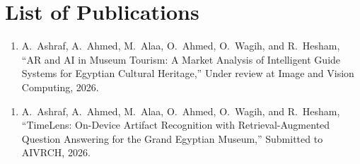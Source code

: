 \chapter*{List of Publications}

\begin{enumerate}[leftmargin=2em]
  \item A.\ Ashraf, A.\ Ahmed, M.\ Alaa, O.\ Ahmed, O.\ Wagih, and R.\ Hesham,
        ``AR and AI in Museum Tourism: A Market Analysis of Intelligent Guide
        Systems for Egyptian Cultural Heritage,'' Under review at Image and Vision Computing, 2026.
\end{enumerate}

\begin{enumerate}[leftmargin=2em]
  \item A.\ Ashraf, A.\ Ahmed, M.\ Alaa, O.\ Ahmed, O.\ Wagih, and R.\ Hesham,
        ``TimeLens:
        On-Device Artifact Recognition
        with Retrieval-Augmented Question Answering
        for the Grand Egyptian Museum,'' Submitted to AIVRCH, 2026.
\end{enumerate}


  


  